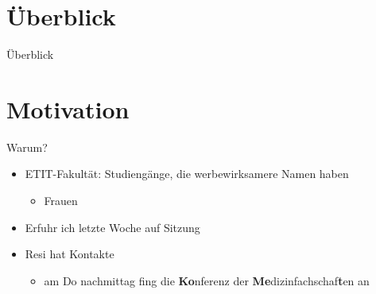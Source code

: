 % 
\section*{Überblick}
\begin{frame}{Überblick}
  \tableofcontents
\end{frame}

\section{Motivation}
\begin{frame}{Warum?}
  \begin{itemize}
  \item ETIT-Fakultät: Studiengänge, die werbewirksamere Namen haben
    \begin{itemize}
    \item Frauen
    \end{itemize}
  \item Erfuhr ich letzte Woche auf Sitzung
  \item Resi hat Kontakte
    \begin{itemize}
    \item am Do nachmittag fing die \textbf{Ko}nferenz der
      \textbf{Me}dizinfachschaf\textbf{t}en an
    \end{itemize}
  \end{itemize}
\end{frame}

